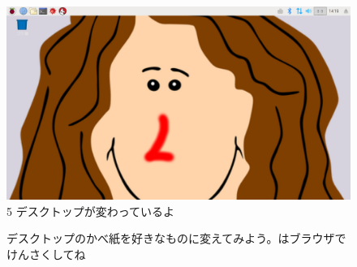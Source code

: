\documentclass[a4paper,12pt]{jarticle}
\begin{document}
\begin{figure}
  \flushleft
  \begin{minipage}{0.45\textwidth}
    \includegraphics[width=0.85\linewidth]{textbook-img111.png}\\
    5 デスクトップが変わっているよ
  \end{minipage}

  \bigskip

  \theQuestion\label{Q:hasAnswer02-7}

  デスクトップのかべ紙を好きなものに変えてみよう。はブラウザでけんさくしてね
\end{figure}


\bigskip

\clearpage
\end{document}

